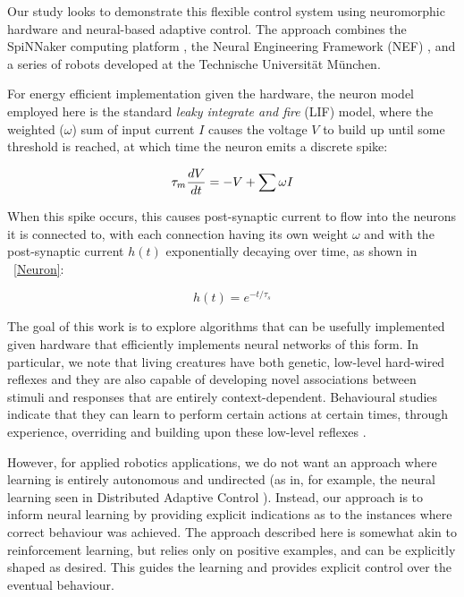 \documentclass{frontiersSCNS}
\begin{document}
Our study looks to demonstrate this flexible control system using 
neuromorphic hardware and neural-based adaptive control. The approach 
combines the SpiNNaker computing 
platform \citep{furber2007neural, furber2014spinnaker}, the Neural Engineering 
Framework (NEF)  \citep{eliasmith2004neural}, and a series of robots developed at 
the Technische Universit{\"a}t M{\"u}nchen. 


For energy efficient implementation given the hardware, the neuron model
employed here is the standard \textit{leaky integrate and fire} (LIF) model, 
where the weighted ($\omega$) sum of input current $I$ causes the voltage $V$ to build up until some
threshold is reached, at which time the neuron emits a discrete spike:

\begin{equation}
    \tau_m {dV \over dt} = -V + \sum \omega I
\end{equation}

When this spike occurs, this causes post-synaptic current to flow into the 
neurons it is connected to, with each connection having its own weight $\omega$
and with the post-synaptic current $h(t)$ exponentially decaying over time, 
as shown in \figurename~\ref{Neuron}:

\begin{equation}
    h(t) = e^{-t/\tau_s}
\end{equation}

The goal of this work is to explore algorithms that can be usefully implemented
given hardware that efficiently implements neural networks of this form.  In
particular, we note that living creatures have both genetic, low-level 
hard-wired reflexes and they are also capable of developing novel associations 
between stimuli and responses that are entirely context-dependent. Behavioural 
studies indicate that they can learn to perform certain actions at certain 
times, through experience, overriding and building upon these low-level 
reflexes \citep{kim2007encoding}. 

However, for applied robotics applications, we do not want an approach where
learning is entirely autonomous and undirected (as in, for example, the neural
learning seen in Distributed Adaptive Control \citep{verschure2012distributed}). 
Instead, our approach is to inform neural learning by providing explicit
indications as to the instances where correct behaviour was achieved.  The 
approach described here is somewhat akin to reinforcement learning, but relies
only on positive examples, and can be explicitly shaped as desired.  This 
guides the learning and provides explicit control over the eventual behaviour. 
\end{document}
